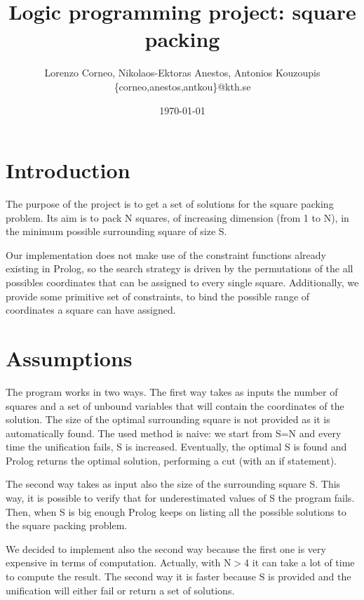 \documentclass{article}[10pt]
\begin{document}
\title{Logic programming project: square packing}
\author{Lorenzo Corneo, Nikolaos-Ektoras Anestos, Antonios Kouzoupis \\
	\{corneo,anestos,antkou\}@kth.se}
\date{\today}
\maketitle

\section{Introduction}

The purpose of the project is to get a set of solutions for the square packing problem. Its aim is to pack N squares, of increasing dimension (from 1 to N), in the minimum possible surrounding square of size S.

Our implementation does not make use of the constraint functions already existing in Prolog, so the search strategy is driven by the permutations of the all possibles coordinates that can be assigned to every single square. Additionally, we provide some primitive set of constraints, to bind the possible range of coordinates a square can have assigned.

\section{Assumptions}

The program works in two ways. The first way takes as inputs the number of squares and a set of unbound variables that will contain the coordinates of the solution. The size of the optimal surrounding square is not provided as it is automatically found. The used method is naive: we start from S=N and every time the unification fails, S is increased. Eventually, the  optimal S is found and Prolog returns the optimal solution, performing a cut (with an if statement).

The second way takes as input also the size of the surrounding square S. This way, it is possible to verify that for underestimated values of S the program fails. Then, when S is big enough Prolog keeps on listing all the possible solutions to the square packing problem.

We decided to implement also the second way because the first one is very expensive in terms of computation. Actually, with N$>$4 it can take a lot of time to compute the result. The second way it is faster because S is provided and the unification will either fail or return a set of solutions.
\end{document}
